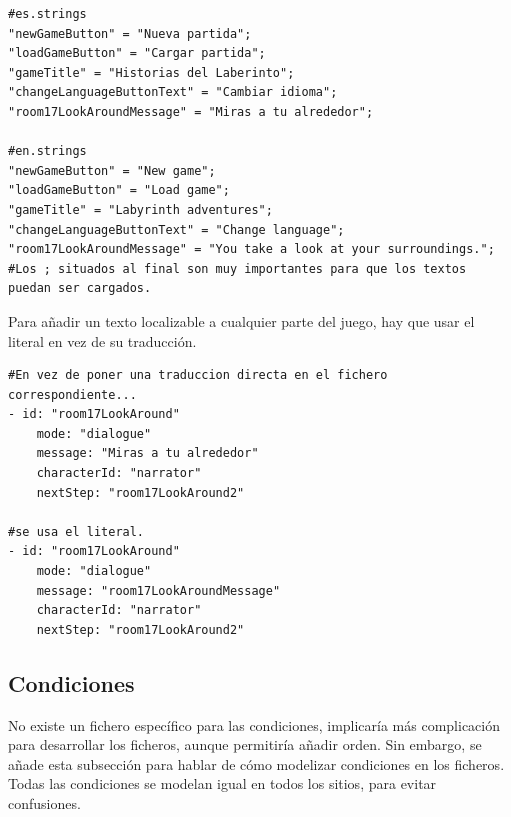 \begin{lstlisting}
#es.strings
"newGameButton" = "Nueva partida";
"loadGameButton" = "Cargar partida";
"gameTitle" = "Historias del Laberinto";
"changeLanguageButtonText" = "Cambiar idioma";
"room17LookAroundMessage" = "Miras a tu alrededor";

#en.strings
"newGameButton" = "New game";
"loadGameButton" = "Load game";
"gameTitle" = "Labyrinth adventures";
"changeLanguageButtonText" = "Change language";
"room17LookAroundMessage" = "You take a look at your surroundings.";
#Los ; situados al final son muy importantes para que los textos puedan ser cargados.
\end{lstlisting}

Para añadir un texto localizable a cualquier parte del juego, hay que usar el literal en vez de su traducción.
\begin{lstlisting}
#En vez de poner una traduccion directa en el fichero correspondiente...
- id: "room17LookAround"
	mode: "dialogue"
	message: "Miras a tu alrededor"
	characterId: "narrator"
	nextStep: "room17LookAround2"

#se usa el literal.
- id: "room17LookAround"
	mode: "dialogue"
	message: "room17LookAroundMessage"
	characterId: "narrator"
	nextStep: "room17LookAround2"
\end{lstlisting}

\subsection{Condiciones}
No existe un fichero específico para las condiciones, implicaría más complicación para desarrollar los ficheros, aunque permitiría añadir orden.
Sin embargo, se añade esta subsección para hablar de cómo modelizar condiciones en los ficheros. Todas las condiciones se modelan igual en todos los sitios, para evitar confusiones.

